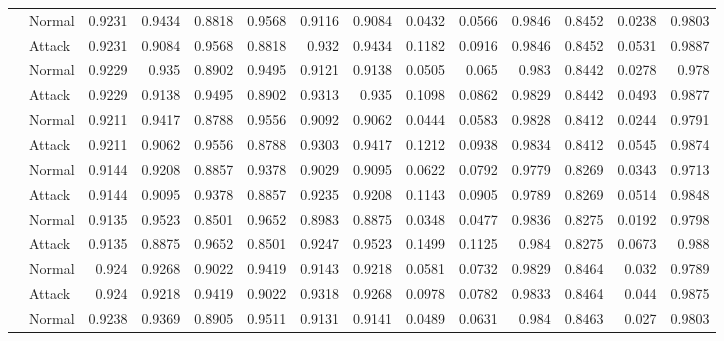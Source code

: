 \begin{tabular}{llrrrrrrrrrrrr}
                & Normal     &     0.9231 &      0.9434 &   0.8818 &        0.9568 &     0.9116 & 0.9084 & 0.0432 & 0.0566 &    0.9846 & 0.8452 & 0.0238 &   0.9803 \\
                & Attack     &     0.9231 &      0.9084 &   0.9568 &        0.8818 &     0.932  & 0.9434 & 0.1182 & 0.0916 &    0.9846 & 0.8452 & 0.0531 &   0.9887 \\
                & Normal     &     0.9229 &      0.935  &   0.8902 &        0.9495 &     0.9121 & 0.9138 & 0.0505 & 0.065  &    0.983  & 0.8442 & 0.0278 &   0.978  \\
                & Attack     &     0.9229 &      0.9138 &   0.9495 &        0.8902 &     0.9313 & 0.935  & 0.1098 & 0.0862 &    0.9829 & 0.8442 & 0.0493 &   0.9877 \\
                & Normal     &     0.9211 &      0.9417 &   0.8788 &        0.9556 &     0.9092 & 0.9062 & 0.0444 & 0.0583 &    0.9828 & 0.8412 & 0.0244 &   0.9791 \\
                & Attack     &     0.9211 &      0.9062 &   0.9556 &        0.8788 &     0.9303 & 0.9417 & 0.1212 & 0.0938 &    0.9834 & 0.8412 & 0.0545 &   0.9874 \\
                & Normal     &     0.9144 &      0.9208 &   0.8857 &        0.9378 &     0.9029 & 0.9095 & 0.0622 & 0.0792 &    0.9779 & 0.8269 & 0.0343 &   0.9713 \\
                & Attack     &     0.9144 &      0.9095 &   0.9378 &        0.8857 &     0.9235 & 0.9208 & 0.1143 & 0.0905 &    0.9789 & 0.8269 & 0.0514 &   0.9848 \\
                & Normal     &     0.9135 &      0.9523 &   0.8501 &        0.9652 &     0.8983 & 0.8875 & 0.0348 & 0.0477 &    0.9836 & 0.8275 & 0.0192 &   0.9798 \\
                & Attack     &     0.9135 &      0.8875 &   0.9652 &        0.8501 &     0.9247 & 0.9523 & 0.1499 & 0.1125 &    0.984  & 0.8275 & 0.0673 &   0.988  \\
                & Normal     &     0.924  &      0.9268 &   0.9022 &        0.9419 &     0.9143 & 0.9218 & 0.0581 & 0.0732 &    0.9829 & 0.8464 & 0.032  &   0.9789 \\
                & Attack     &     0.924  &      0.9218 &   0.9419 &        0.9022 &     0.9318 & 0.9268 & 0.0978 & 0.0782 &    0.9833 & 0.8464 & 0.044  &   0.9875 \\
                & Normal     &     0.9238 &      0.9369 &   0.8905 &        0.9511 &     0.9131 & 0.9141 & 0.0489 & 0.0631 &    0.984  & 0.8463 & 0.027  &   0.9803 \\

\end{tabular}
